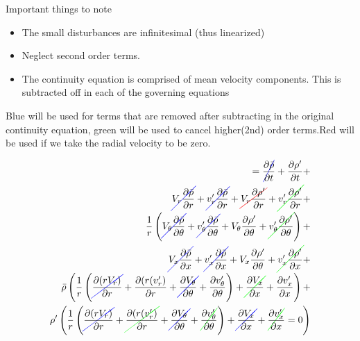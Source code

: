 Important things to note
\begin{itemize}
	\item The small disturbances are infinitesimal (thus linearized)
	\item Neglect second order terms.
	\item The continuity equation is comprised of mean velocity components. This is subtracted off in each of the governing equations
\end{itemize}
Blue will be used for terms that are removed after subtracting in the original continuity equation, green will be used to cancel higher(2nd) order terms.Red will be used if we take the radial velocity to be zero.

\begin{align*}
=
\Ccancel[blue]
{\frac{\partial \bar{\rho}}{\partial t}} + 
\frac{\partial \rho'     }{\partial t} + \\
\Ccancel[blue]  {V_r \frac{\partial \bar{\rho}}{\partial r}} +  
\Ccancel[blue] {v_r'\frac{\partial \bar{\rho}}{\partial r}} + 
\Ccancel[red]{V_r \frac{\partial \rho'}{\partial r}} +
\Ccancel[green]{v_r'\frac{\partial \rho'}{\partial r}} + \\
\frac{1}{r}
\left(
\Ccancel[blue]{V_{\theta} \frac{\partial \bar{\rho}}{\partial \theta}} +
\Ccancel[blue]{v_{\theta}'\frac{\partial \bar{\rho}}{\partial \theta}} + 
V_{\theta} \frac{\partial \rho'		}{\partial \theta} + 
\Ccancel[green]{v_{\theta}'\frac{\partial \rho'		}{\partial \theta}}
\right) + \\ 
\Ccancel[blue]{V_x \frac{\partial \bar{\rho}}{\partial x}} + 
\Ccancel[blue]{v_x'\frac{\partial \bar{\rho}}{\partial x}} +
V_x \frac{\partial \rho'	 }{\partial \theta} 	+
\Ccancel[green]{v_x'\frac{\partial \rho'    }{\partial x}}		+\\
\bar{\rho} 
\left(
\frac{1}{r}
\left(
\Ccancel[blue]{\frac{\partial (rV_r  )    }{\partial r}} +
\frac{\partial (r(v_r')    }{\partial r} +
\Ccancel[blue]{\frac{\partial V_{\theta}  }{\partial \theta}} +
\frac{\partial v_{\theta}' }{\partial \theta}
\right) +
\Ccancel[green]{\frac{\partial V_x }{\partial x}} +
\frac{\partial v_x'}{\partial x}
\right) + \\
\rho'
\left(
\frac{1}{r}
\left(
\Ccancel[blue]{\frac{\partial (rV_r  )    }{\partial r}} +
\Ccancel[green]{\frac{\partial (r(v_r')    }{\partial r} }+
\Ccancel[blue]{\frac{\partial V_{\theta}  }{\partial \theta} }+
\Ccancel[green]{\frac{\partial v_{\theta}' }{\partial \theta}}
\right) +
\Ccancel[blue]{\frac{\partial V_x }{\partial x}} +
\Ccancel[green]{\frac{\partial v_x'}{\partial x}} = 0
\right)
\end{align*}

